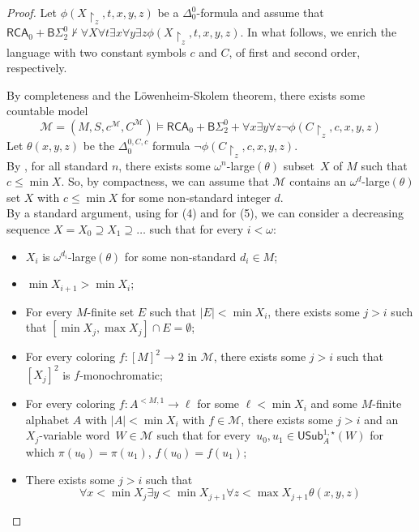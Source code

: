 \documentclass{article}
\numberwithin{theorem}{section}
\newcommand{\RCA}{\mathsf{RCA}}
\newcommand{\BSig}{\mathsf{B}\Sigma^0}
\newcommand{\M}{\mathcal{M}}
\newcommand{\uh}[0]{{\upharpoonright}}
\newcommand{\USub}{\mathsf{USub}}
\begin{document}
\begin{proof}
Let $\phi(X\uh_z,t,x,y,z)$ be a $\Delta_0^0$-formula and assume that $\RCA_0 + \BSig_2 \not \vdash \forall X \forall t \exists x \forall y \exists z \phi(X\uh_z,t,x,y,z)$. In what follows, we enrich the language with two constant symbols $c$ and $C$, of first and second order, respectively.

By completeness and the Löwenheim-Skolem theorem, there exists some countable model $$\M = (M,S,c^\M, C^\M) \models \RCA_0 + \BSig_2 + \forall x \exists y \forall z \neg \phi(C\uh_z,c,x,y,z)$$
Let $\theta(x,y,z)$ be the $\Delta_0^{0,C,c}$ formula $\neg \phi(C\uh_z,c,x,y,z)$. \\


By , for all standard $n$, there exists some $\omega^n$-large$(\theta)$ subset~$X$ of $M$ such that $c \leq \min X$. So, by compactness, we can assume that $\M$ contains an $\omega^{d}$-large$(\theta)$ set $X$ with $c \leq \min X$ for some non-standard integer $d$. \\

By a standard argument, using  for (4) and  for (5), we can consider a decreasing sequence $X = X_0 \supseteq X_1 \supseteq \dots$ such that for every $i < \omega$:

\begin{itemize}
\item[(1)] $X_i$ is $\omega^{d_i}$-large$(\theta)$ for some non-standard $d_i \in M$;
\item[(2)] $\min X_{i+1} > \min X_i$;
\item[(3)] For every $M$-finite set $E$ such that $|E| < \min X_i$, there exists some $j > i$ such that $[\min X_j, \max X_j] \cap E = \emptyset$;
\item[(4)] For every coloring $f : [M]^2 \to 2$ in $\M$, there exists some $j > i$ such that $[X_j]^2$ is $f$-monochromatic;
\item[(5)] For every coloring $f : A^{<M,1} \to \ell$ for some $\ell < \min X_i$ and some $M$-finite alphabet $A$ with $|A| < \min X_i$ with $f \in \M$, there exists some $j > i$ and an $X_j$-variable word~$W \in \M$ such that for every~$u_0, u_1 \in \USub^{1,\star}_A(W)$ for which $\pi(u_0) = \pi(u_1)$, $f(u_0) = f(u_1)$;
\item[(6)] There exists some $j > i$ such that 
$$\forall x < \min X_{j} \exists y < \min X_{j+1} \forall z < \max X_{j+1} \theta(x,y,z)$$

\end{itemize}


\end{proof}
\end{document}
